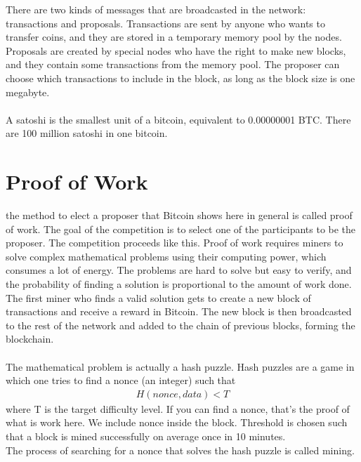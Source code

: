 \documentclass{report}
\begin{document}
There are two kinds of messages that are broadcasted in the network: transactions and proposals. Transactions are sent by anyone who wants to transfer coins, and they are stored in a temporary memory pool by the nodes. Proposals are created by special nodes who have the right to make new blocks, and they contain some transactions from the memory pool. The proposer can choose which transactions to include in the block, as long as the block size is one megabyte.\\\\
A satoshi is the smallest unit of a bitcoin, equivalent to 0.00000001 BTC. There are 100 million satoshi in one bitcoin.

\section{Proof of Work}
the method to elect a proposer that Bitcoin shows here in general is called proof of work. The goal of the competition is to select one of the participants to be the proposer.  The competition proceeds like this.  Proof of work requires miners to solve complex mathematical problems using their computing power, which consumes a lot of energy. The problems are hard to solve but easy to verify, and the probability of finding a solution is proportional to the amount of work done. The first miner who finds a valid solution gets to create a new block of transactions and receive a reward in Bitcoin. The new block is then broadcasted to the rest of the network and added to the chain of previous blocks, forming the blockchain.\\\\
The mathematical problem is actually a hash puzzle. Hash puzzles are a game in which one tries to find a nonce (an integer) such that 
\begin{align*}
	H(nonce, data) < T
\end{align*}
where T is the target difficulty level. If you can find a nonce, that's the proof of what is work here. We include nonce inside the block. Threshold is chosen such that a block is mined successfully on average once in 10 minutes.\\
The process of searching for a nonce that solves the hash puzzle is called mining.
\end{document}

